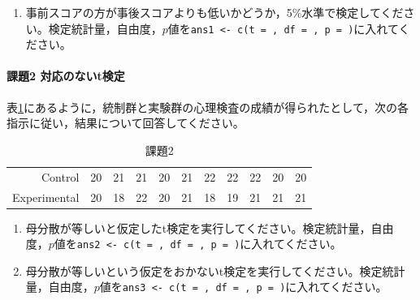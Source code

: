 \documentclass{ltjsbook}
\begin{document}
\begin{enumerate}
	\item 事前スコアの方が事後スコアよりも低いかどうか，5\%水準で検定してください。検定統計量，自由度，$p$値を\verb|ans1 <- c(t = , df = , p = )|に入れてください。
\end{enumerate}

\paragraph{課題2 対応のないt検定}
表\ref{exe:16_3}にあるように，統制群と実験群の心理検査の成績が得られたとして，次の各指示に従い，結果について回答してください。
\begin{table}[ht]
	\centering
	\caption{課題2}
	\label{exe:16_3}
	\begin{tabular}{rrrrrrrrrrr}
		\hline
		Control      & 20 & 21 & 21 & 20 & 21 & 22 & 22 & 22 & 20 & 20 \\
		Experimental & 20 & 18 & 22 & 20 & 21 & 18 & 19 & 21 & 21 & 21 \\
		\hline
	\end{tabular}
\end{table}

\begin{enumerate}
	\item 母分散が等しいと仮定したt検定を実行してください。検定統計量，自由度，$p$値を\verb|ans2 <- c(t = , df = , p = )|に入れてください。
	\item 母分散が等しいという仮定をおかないt検定を実行してください。検定統計量，自由度，$p$値を\verb|ans3 <- c(t = , df = , p = )|に入れてください。
\end{enumerate}
\end{document}
